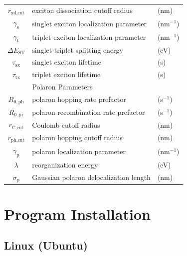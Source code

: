 \documentclass[%
 reprint,onecolumn,notitlepage,
superscriptaddress,longbibliography,
 amsmath,amssymb,
 aps,rmp,floatfix,
]{revtex4-1}
\begin{document}
\begin{center}
\begin{tabular}{ c l l }
$r_{\text{xd,cut}}$ & exciton dissociation cutoff radius & (nm) \\
$\gamma_\text{s}$ & singlet exciton localization parameter & (nm$^{-1}$) \\
$\gamma_\text{t}$ & triplet exciton localization parameter & (nm$^{-1}$) \\
$\Delta E_\text{ST}$ & singlet-triplet splitting energy & (eV) \\
$\tau_\text{sx}$ & singlet exciton lifetime & (s) \\
$\tau_\text{tx}$ & triplet exciton lifetime & (s) \\
\hline
 & Polaron Parameters & \\
 \hline
 $R_{0,\text{ph}}$ & polaron hopping rate prefactor & (s$^{-1}$) \\
$R_{0,\text{pr}}$ & polaron recombination rate prefactor & (s$^{-1}$) \\
$r_{\text{C,cut}}$ & Coulomb cutoff radius & (nm) \\
$r_{\text{ph,cut}}$ & polaron hopping cutoff radius & (nm) \\
$\gamma_\text{p}$ & polaron localization parameter & (nm$^{-1}$) \\
$\lambda$ & reorganization energy & (eV) \\
$\sigma_\text{p}$ & Gaussian polaron delocalization
length & (nm) \\
\end{tabular}
\end{center}

\section{Program Installation}

\subsection{Linux (Ubuntu)}
\end{document}
